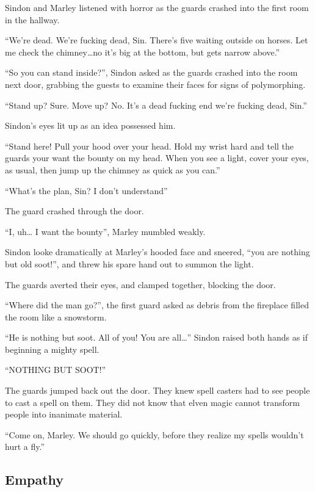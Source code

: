 \begin{multicols}{2}
\begin{exampletext}
  Sindon and Marley listened with horror as the guards crashed into the first room in the hallway.

  ``We're dead.
  We're fucking dead, Sin.
  There's five waiting outside on horses.
  Let me check the chimney\ldots no it's big at the bottom, but gets narrow above.''

  ``So you can stand inside?'', Sindon asked as the guards crashed into the room next door, grabbing the guests to examine their faces for signs of polymorphing.

  ``Stand up?
  Sure.
  Move up?
  No.
  It's a dead fucking end we're fucking dead, Sin.''

  Sindon's eyes lit up as an idea possessed him.

  ``Stand here!
  Pull your hood over your head.
  Hold my wrist hard and tell the guards your want the bounty on my head.
  When you see a light, cover your eyes, as usual, then jump up the chimney as quick as you can.''

  ``What's the plan, Sin?
  I don't understand''

  The guard crashed through the door.

  ``I, uh\ldots
  I want the bounty'', Marley mumbled weakly.

  Sindon looke dramatically at Marley's hooded face and sneered, ``you are nothing but old soot!'', and threw his spare hand out to summon the light.

  The guards averted their eyes, and clamped together, blocking the door.
  
  ``Where did the man go?'', the first guard asked as debris from the fireplace filled the room like a snowstorm.

  ``He is nothing but soot.
  All of you!
  You are all\ldots''
  Sindon raised both hands as if beginning a mighty spell.

  ``NOTHING BUT SOOT!''

  The guards jumped back out the door.
  They knew spell casters had to see people to cast a spell on them.
  They did not know that elven magic cannot transform people into inanimate material.

  ``Come on, Marley.
  We should go quickly, before they realize my spells wouldn't hurt a fly.''

\end{exampletext}

\subsection{Empathy}


\end{multicols}
